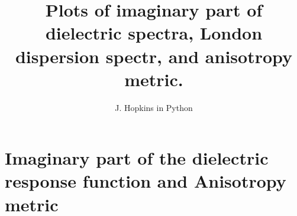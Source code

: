 \documentclass[onecolumn,letterpaper,amsmath,amssymb,floatfix,aps,superscriptaddress]{revtex4}
\begin{document}
\title{\bf Plots of imaginary part of dielectric spectra, London dispersion
spectr, and anisotropy metric.}

\author{J. Hopkins in Python}
    

\maketitle        

\section{Imaginary part of the dielectric response function and Anisotropy metric}
\end{document}

